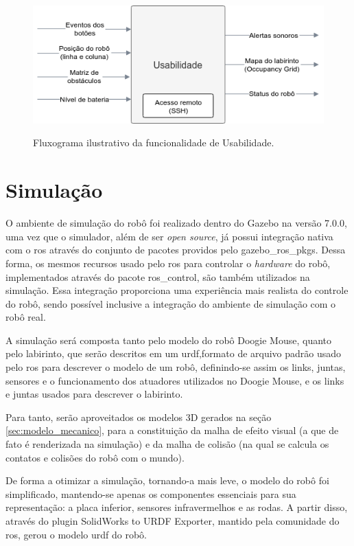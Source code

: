 \begin{figure}[H]
	\centering
	\caption{Fluxograma ilustrativo da funcionalidade de Usabilidade.}
	\includegraphics[width=1\textwidth]
	{Figures/especificacao_funcional_usabilidade}
	\label{fig:especificacao_funcional_usabilidade}
\end{figure}

\section{Simulação}
\label{sec:Simulacao}
O ambiente de simulação do robô foi realizado dentro do Gazebo \cite{Koenig2004} na versão 7.0.0, uma vez que o simulador, além de ser \textit{open source}, já possui integração nativa com o \gls*{ros} através do conjunto de pacotes providos pelo gazebo\_ros\_pkgs. Dessa forma, os mesmos recursos usado pelo \gls*{ros} para controlar o \textit{hardware} do robô, implementados através do pacote ros\_control, são também utilizados na simulação. Essa integração proporciona uma experiência mais realista do controle do robô, sendo possível inclusive a integração do ambiente de simulação com o robô real. 

A simulação será composta tanto pelo modelo do robô Doogie Mouse, quanto pelo labirinto, que serão descritos em um \gls*{urdf},formato de arquivo padrão usado pelo \gls*{ros} para descrever o modelo de um robô, definindo-se assim os links, juntas, sensores e o funcionamento dos atuadores utilizados no Doogie Mouse, e os links e juntas usados para descrever o labirinto.

Para tanto, serão aproveitados os modelos 3D gerados na seção \ref{sec:modelo_mecanico}, para a constituição da malha de efeito visual (a que de fato é renderizada na simulação) e da malha de colisão (na qual se calcula os contatos e colisões do robô com o mundo).

De forma a otimizar a simulação, tornando-a mais leve, o modelo do robô foi simplificado, mantendo-se apenas os componentes essenciais para sua representação: a placa inferior, sensores infravermelhos e as rodas. A partir disso, através do plugin SolidWorks to URDF Exporter, mantido pela comunidade do \gls*{ros}, gerou o modelo \gls*{urdf} do robô.

